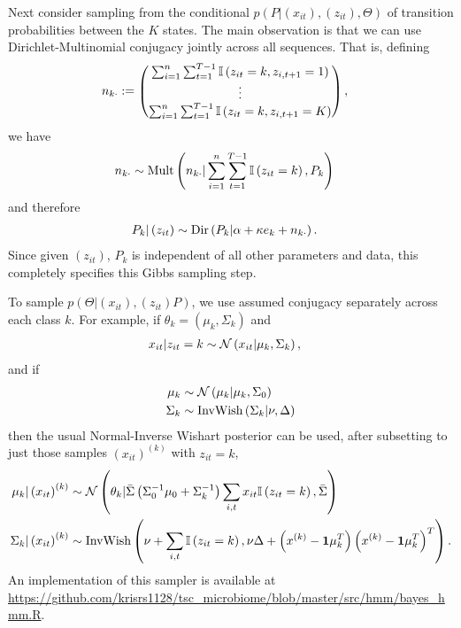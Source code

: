 \documentclass[14pt]{extreport}
\begin{document}
Next consider sampling from the conditional $p\left(P \vert
\left(x_{it}\right), \left(z_{it}\right), \Theta\right)$ of transition
probabilities between the $K$ states. The main observation is that we can use
Dirichlet-Multinomial conjugacy jointly across all sequences. That is, defining
\begin{align*}
 n_{k \cdot} &:= \begin{pmatrix} \sum_{i = 1}^{n} \sum_{t = 1}^{T - 1} \mathbb{I}\left({z_{it} = k, z_{i,t + 1} = 1}\right) \\ \vdots \\ \sum_{i = 1}^{n} \sum_{t = 1}^{T - 1} \mathbb{I}\left({z_{it} = k, z_{i,t + 1} = K}\right) \end{pmatrix},
\end{align*}
we have
\begin{align*}
n_{k\cdot} &\sim \textnormal{Mult}\left(n_{k\cdot} \vert \sum_{i = 1}^{n} \sum_{t = 1}^{T - 1} \mathbb{I}\left({z_{it} = k}\right), P_{k}\right)
\end{align*}
and therefore
\begin{align}
  \label{eq:sticky_hmm_p_update}
  P_{k} \vert \left(z_{it}\right) &\sim \textnormal{Dir}\left(P_{k} \vert \alpha + \kappa e_{k} + n_{k\cdot}\right).
\end{align}
Since given $\left(z_{it}\right)$, $P_{k}$ is independent of all other
parameters and data, this completely specifies this Gibbs sampling step.

To sample $p\left(\Theta \vert \left(x_{it}\right), \left(z_{it}\right)
P\right)$, we use assumed conjugacy separately across each class $k$. For
example, if $\theta_{k} = \left(\mu_{k}, \Sigma_{k}\right)$ and
\begin{align*}
  x_{it} \vert z_{it} = k &\sim \mathcal{N}\left(x_{it} \vert \mu_{k}, \Sigma_{k}\right),
\end{align*}
and if
\begin{align*}
  \mu_{k} &\sim \mathcal{N}\left(\mu_{k} \vert \mu_{k}, \Sigma_{0}\right) \\
  \Sigma_{k} &\sim \text{InvWish}\left(\Sigma_{k} \vert \nu, \Delta\right)
\end{align*}
then the usual Normal-Inverse Wishart posterior can be used, after subsetting to just those
samples $\left(x_{it}\right)^{(k)}$ with $z_{it} = k$,
\begin{align*}
  \mu_{k} \vert \left(x_{it}\right)^{(k)} &\sim \mathcal{N}\left(\theta_{k} \vert \bar{\Sigma}\left(\Sigma_0^{-1}\mu_{0} + \Sigma_{k}^{-1}\right) \sum_{i, t} x_{it}\mathbb{I}\left({z_{it} = k}\right), \bar{\Sigma}\right) \\
  \Sigma_{k} \vert \left(x_{it} \right)^{(k)} &\sim  \text{InvWish}\left(\nu + \sum_{i, t} \mathbb{I}\left({z_{it} = k}\right), \nu \Delta + \left(x^{(k)} - \mathbf{1} \mu_{k}^{T}\right)\left(x^{(k)} - \mathbf{1} \mu_{k}^{T}\right)^{T}\right).
\end{align*}
An implementation of this sampler is available at
\href{https://github.com/krisrs1128/tsc\_microbiome/blob/master/src/hmm/bayes\_hmm.R}{https://github.com/krisrs1128/tsc\_microbiome/blob/master/src/hmm/bayes\_hmm.R}.
\end{document}

